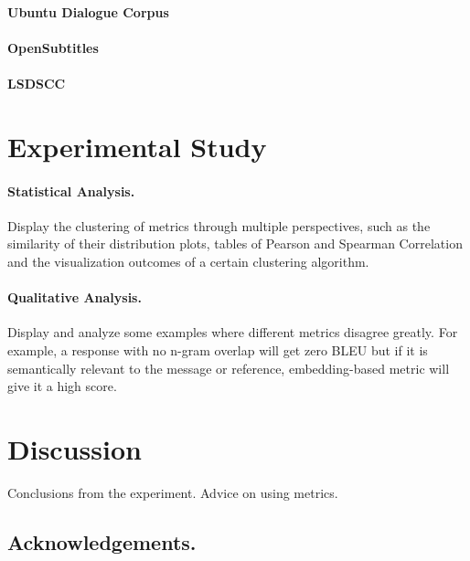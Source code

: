 \documentclass[runningheads]{llncs}
\begin{document}
    \paragraph{Ubuntu Dialogue Corpus}
    \paragraph{OpenSubtitles}
    \paragraph{LSDSCC}


    \section{Experimental Study}
    \paragraph{Statistical Analysis.}
    Display the clustering of metrics through multiple perspectives,
    such as the similarity of their distribution plots, tables of Pearson and Spearman Correlation
    and the visualization outcomes of a certain clustering algorithm.

    \paragraph{Qualitative Analysis.}
    Display and analyze some examples where different metrics disagree greatly.
    For example, a response with no n-gram overlap will get zero BLEU but if it is semantically
    relevant to the message or reference, embedding-based metric will give it a high score.

    \section{Discussion}
    Conclusions from the experiment.
    Advice on using metrics.

    \subsection*{Acknowledgements.}

    
    
\end{document}
